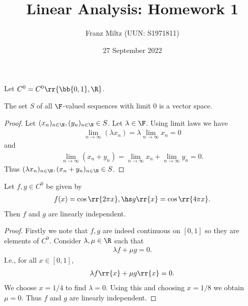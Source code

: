 \documentclass{article}
\begin{document}
\title{Linear Analysis: Homework 1}
\author{Franz Miltz (UUN: S1971811)}
\date{27 September 2022}
\maketitle

Let $C^0=C^0 \rr{ \bb{ 0,1 }, \R }$.

\begin{claim*}[2d]
  The set $S$ of all $\F$-valued sequences with limit $0$ is a vector space.
  \begin{proof}
    Let $(x_n)_{n\in\N},(y_n)_{n\in\N}\in S$. Let $\lambda\in\F$. Using limit laws we have
    \begin{align*}
      \lim_{n\to\infty}(\lambda x_n) = \lambda \lim_{n\to\infty} x_n = 0
    \end{align*}
    and
    \begin{align*}
      \lim_{n\to \infty}(x_n + y_n) = \lim_{n\to\infty} x_n + \lim_{n\to\infty} y_n = 0.
    \end{align*}
    Thus $(\lambda x_n)_{n\in\N},(x_n + y_n)_{n\in\N}\in S$.
  \end{proof}
\end{claim*}

\begin{claim*}[5]
  Let $f,g\in C^0$ be given by
  \begin{align*}
    f(x)=\cos\rr{2\pi x}, \hs g \rr{ x } = \cos \rr{ 4\pi x }.
  \end{align*}
  Then $f$ and $g$ are linearly independent.
  \begin{proof}
    Firstly we note that $f,g$ are indeed continuous on $[0,1]$ so they are elements of $C^0$.
    Consider $\lambda,\mu\in\R$ such that
    \begin{align*}
      \lambda f + \mu g = 0.
    \end{align*}
    I.e., for all $x\in[0,1]$, \begin{align*}
      \lambda f \rr{ x } + \mu g \rr{ x } = 0.
    \end{align*}
    We choose $x=1/4$ to find $\lambda = 0$. Using this and choosing $x=1/8$ we obtain $\mu=0$.
    Thus $f$ and $g$ are linearly independent.
  \end{proof}
\end{claim*}
\end{document}
